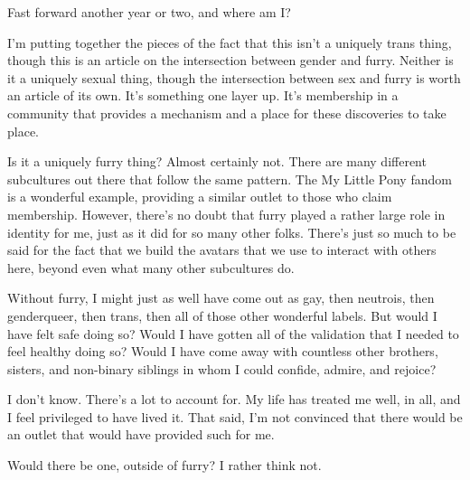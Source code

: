 Fast forward another year or two, and where am I?

I'm putting together the pieces of the fact that this isn't a uniquely trans thing, though this is an article on the intersection between gender and furry. Neither is it a uniquely sexual thing, though the intersection between sex and furry is worth an article of its own. It's something one layer up. It's membership in a community that provides a mechanism and a place for these discoveries to take place.

Is it a uniquely furry thing?  Almost certainly not. There are many different subcultures out there that follow the same pattern. The My Little Pony fandom is a wonderful example, providing a similar outlet to those who claim membership. However, there's no doubt that furry played a rather large role in identity for me, just as it did for so many other folks. There's just so much to be said for the fact that we build the avatars that we use to interact with others here, beyond even what many other subcultures do.

Without furry, I might just as well have come out as gay, then neutrois, then genderqueer, then trans, then all of those other wonderful labels. But would I have felt safe doing so?  Would I have gotten all of the validation that I needed to feel healthy doing so?  Would I have come away with countless other brothers, sisters, and non-binary siblings in whom I could confide, admire, and rejoice?

I don't know. There's a lot to account for. My life has treated me well, in all, and I feel privileged to have lived it. That said, I'm not convinced that there would be an outlet that would have provided such for me.

Would there be one, outside of furry?  I rather think not.
